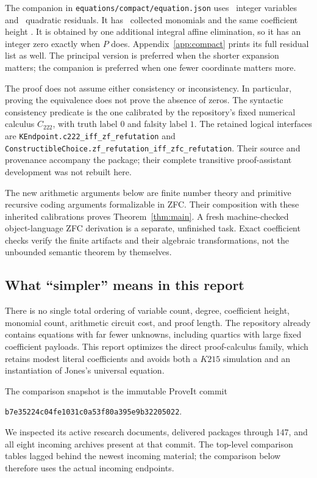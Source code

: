 \documentclass[11pt]{article}
\theoremstyle{remark}\newtheorem{remark}[theorem]{Remark}
\begin{document}
The companion in \nolinkurl{equations/compact/equation.json} uses
\CompactVars\ integer variables and \CompactRows\ quadratic residuals.
It has \CompactTerms\ collected monomials and the same coefficient
height \MainHeight. It is obtained by one additional integral affine
elimination, so it has an integer zero exactly when $P$ does.
Appendix~\ref{app:compact} prints its full residual list as well.
The principal version is preferred when the shorter expansion matters;
the companion is preferred when one fewer coordinate matters more.

The proof does not assume either consistency or inconsistency. In
particular, proving the equivalence does not prove the absence of zeros.
The syntactic consistency predicate is the one calibrated by the
repository's fixed numerical calculus $C_{222}$, with truth label $0$
and falsity label $1$. The retained logical interfaces are
\nolinkurl{KEndpoint.c222_iff_zf_refutation} and
\nolinkurl{ConstructibleChoice.zf_refutation_iff_zfc_refutation}.
Their source and provenance accompany the package; their complete
transitive proof-assistant development was not rebuilt here.

The new arithmetic arguments below are finite number theory and
primitive recursive coding arguments formalizable in ZFC. Their
composition with these inherited calibrations proves
Theorem~\ref{thm:main}. A fresh machine-checked object-language ZFC
derivation is a separate, unfinished task. Exact coefficient checks
verify the finite artifacts and their algebraic transformations, not
the unbounded semantic theorem by themselves.

\subsection{What ``simpler'' means in this report}

There is no single total ordering of variable count, degree, coefficient
height, monomial count, arithmetic circuit cost, and proof length. The
repository already contains equations with far fewer unknowns, including
quartics with large fixed coefficient payloads. This report optimizes the
direct proof-calculus family, which retains modest literal coefficients
and avoids both a $K215$ simulation and an instantiation of Jones's
universal equation.

The comparison snapshot is the immutable ProveIt commit
\begin{center}\small
\texttt{b7e35224c04fe1031c0a53f80a395e9b32205022}.
\end{center}
We inspected its active research documents, delivered packages through
147, and all eight incoming archives present at that commit. The
top-level comparison tables lagged behind the newest incoming material;
the comparison below therefore uses the actual incoming endpoints.
\end{document}
